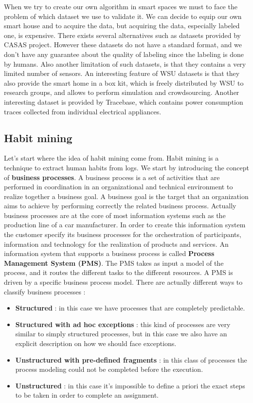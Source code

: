\documentclass[11pt]{article}
\begin{document}
When we try to create our own algorithm in smart spaces we must to face the problem of which dataset we use to validate it. We can decide to equip our own smart house and to acquire the data, but acquiring the data, especially labeled one, is expensive. There exists several alternatives such as datasets provided by CASAS project. However these datasets do not have a standard format, and we don't have any guarantee about the quality of labeling since the labeling is done by humans. Also another limitation of such datasets, is that they contains a very limited number of sensors. An interesting feature of WSU datasets is that they also provide the smart home in a box kit, which is freely distributed by WSU to research groups, and allows to perform simulation and crowdsourcing. Another interesting dataset is provided by Tracebase, which contains power consumption traces collected from individual electrical appliances.

\subsection{Habit mining}
Let's start where the idea of habit mining come from. Habit mining is a technique to extract human habits from logs. We start by introducing the concept of \textbf{business processes}. A business process is a set of activities that are performed in coordination in an organizational and technical environment to realize together a business goal. A business goal is the target that an organization aims to achieve by performing correctly the related business process. Actually business processes are at the core of most information systems such as the production line of a car manufacturer. In order to create this information system the customer specify its business processes for the orchestration of participants, information and technology for the realization of products and services. An information system that supports a business process is called \textbf{Process Management System (PMS)}. The PMS takes as input a model of the process, and it routes the different tasks to the different resources. A PMS is driven by a specific business process model. There are actually different ways to classify business processes :

\begin{itemize}
\item \textbf{Structured} : in this case we have processes that are completely predictable.

\item \textbf{Structured with ad hoc exceptions} : this kind of processes are very similar to simply structured processes, but in this case we also have an explicit description on how we should face exceptions.

\item \textbf{Unstructured with pre-defined fragments} : in this class of processes the process modeling could not be completed before the execution.

\item \textbf{Unstructured} : in this case it's impossible to define a priori the exact steps to be taken in order to complete an assignment.
\end{itemize}
\end{document}
